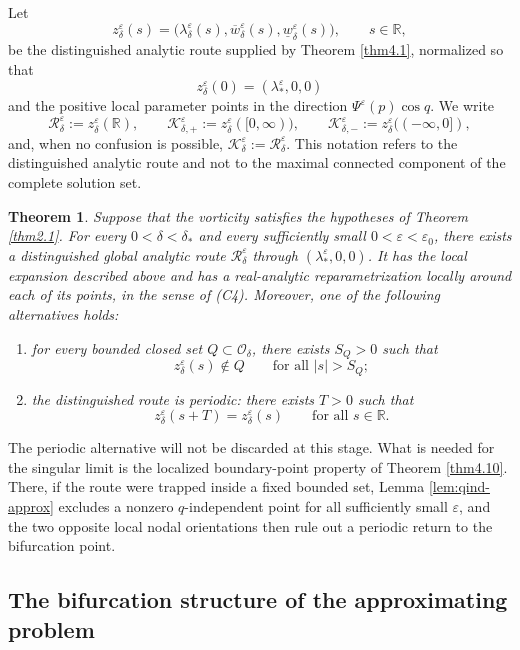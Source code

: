 \documentclass[11pt,reqno]{amsart}
\numberwithin{equation}{section}
\newtheorem{theorem}{Theorem}[section]
\theoremstyle{definition}
\theoremstyle{remark}
\begin{document}
Let
\[
 z_\delta^\varepsilon(s)
 =\bigl(\lambda_\delta^\varepsilon(s),
        \overline w_\delta^\varepsilon(s),
        \underline w_\delta^\varepsilon(s)\bigr),
 \qquad s\in\mathbb R,
\]
be the distinguished analytic route supplied by Theorem
\ref{thm4.1}, normalized so that
\[
 z_\delta^\varepsilon(0)=(\lambda_*^\varepsilon,0,0)
\]
and the positive local parameter points in the direction
$\Psi^\varepsilon(p)\cos q$.  We write
\[
 \mathscr R_\delta^\varepsilon
 :=z_\delta^\varepsilon(\mathbb R),\qquad
 \mathcal K_{\delta,+}^\varepsilon
 :=z_\delta^\varepsilon([0,\infty)),\qquad
 \mathcal K_{\delta,-}^\varepsilon
 :=z_\delta^\varepsilon(( -\infty,0]),
\]
and, when no confusion is possible,
$\mathcal K_\delta^\varepsilon:=\mathscr R_\delta^\varepsilon$.
This notation refers to the distinguished analytic route and not to
the maximal connected component of the complete solution set.

\begin{theorem}\label{thm4.6}
Suppose that the vorticity satisfies the hypotheses of Theorem
\ref{thm2.1}.  For every $0<\delta<\delta_*$ and every sufficiently
small $0<\varepsilon<\varepsilon_0$, there exists a distinguished
global analytic route
$\mathscr R_\delta^\varepsilon$ through
$(\lambda_*^\varepsilon,0,0)$.  It has the local expansion described
above and has a real-analytic reparametrization locally around each
of its points, in the sense of (C4).  Moreover, one of the following
alternatives holds:
\begin{enumerate}
\item for every bounded closed set $Q\subset\mathcal O_\delta$,
there exists $S_Q>0$ such that
\[
 z_\delta^\varepsilon(s)\notin Q
 \qquad\text{for all }|s|>S_Q;
\]
\item the distinguished route is periodic: there exists $T>0$ such that
\[
 z_\delta^\varepsilon(s+T)=z_\delta^\varepsilon(s)
 \qquad\text{for all }s\in\mathbb R.
\]
\end{enumerate}
\end{theorem}

The periodic alternative will not be discarded at this stage.  What
is needed for the singular limit is the localized boundary-point
property of Theorem \ref{thm4.10}.  There, if the route were trapped
inside a fixed bounded set, Lemma \ref{lem:qind-approx} excludes a
nonzero $q$-independent point for all sufficiently small
$\varepsilon$, and the two opposite local nodal orientations then
rule out a periodic return to the bifurcation point.

\subsection{The bifurcation structure of the approximating problem}
\end{document}
